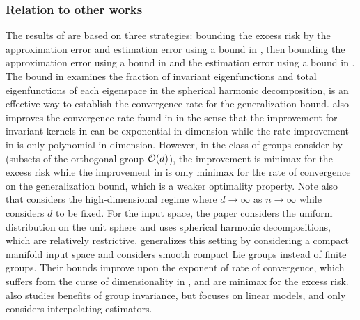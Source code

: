 \subsubsection{Relation to other works}
The results of \cite{bietti2021sample} are based on three strategies: bounding the excess risk by the approximation error and estimation error using a bound in \cite{bach2021learning}, then bounding the approximation error using a bound in \cite{cucker2002mathematical} and the estimation error using a bound in \cite{mei2021learning}. The bound in \cite{mei2021learning} examines the fraction of invariant eigenfunctions and total eigenfunctions of each eigenspace in the spherical harmonic decomposition, is an effective way to establish the convergence rate for the generalization bound. \cite{bietti2021sample} also improves the convergence rate found in \cite{mei2021learning} in the sense that the improvement for invariant kernels in \cite{bietti2021sample} can be exponential in dimension while the rate improvement in \cite{mei2021learning} is only polynomial in dimension. However, in the class of groups consider by \cite{mei2021learning} (subsets of the orthogonal group $\mathcal{O}(d)$), the improvement is minimax for the excess risk while the improvement in \cite{bietti2021sample} is only minimax for the rate of convergence on the generalization bound, which is a weaker optimality property. Note also that \cite{mei2021learning} considers the high-dimensional regime where $d\to\infty$ as $n\to\infty$ while \cite{bietti2021sample} considers $d$ to be fixed. For the input space, the paper considers the uniform distribution on the unit sphere and uses spherical harmonic decompositions, which are relatively restrictive. \cite{tahmasebi2023exact} generalizes this setting by considering a compact manifold input space and considers smooth compact Lie groups instead of finite groups. Their bounds improve upon the exponent of rate of convergence, which suffers from the curse of dimensionality in \cite{bietti2021sample}, and are minimax for the excess risk. \cite{elesedy2021provably} also studies benefits of group invariance, but focuses on linear models, and only considers interpolating estimators.

